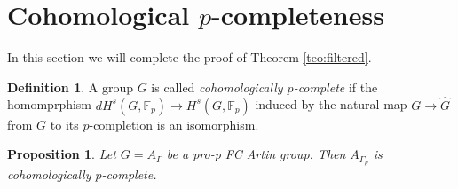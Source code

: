 \documentclass[10pt, oneside]{amsart}
\newcommand{\F}{\mathbb{F}}
\newtheorem{proposition}[theorem]{Proposition}
\theoremstyle{definition}
\newtheorem{definition}[theorem]{Definition}
\theoremstyle{remark}
\theoremstyle{plain}
\begin{document}
\section{Cohomological \texorpdfstring{$p$}--completeness}\label{sec:complete}


In this section we will complete the proof of Theorem \ref{teo:filtered}.

\begin{definition}
    A group $G$ is called {\sl cohomologically $p$-complete} if the homomprphism $dH^s(G,\F_p)\to H^s(G,\F_p)$ induced by the natural map $G\to \hat{G}$ from $G$ to its $p$-completion is an isomorphism.
\end{definition}
\begin{proposition}\label{p-complete}
    Let $G=A_\Gamma$ be a pro-p FC Artin group. Then $A_{\Gamma_p}$ is cohomologically $p$-complete.
\end{proposition}
\end{document}

